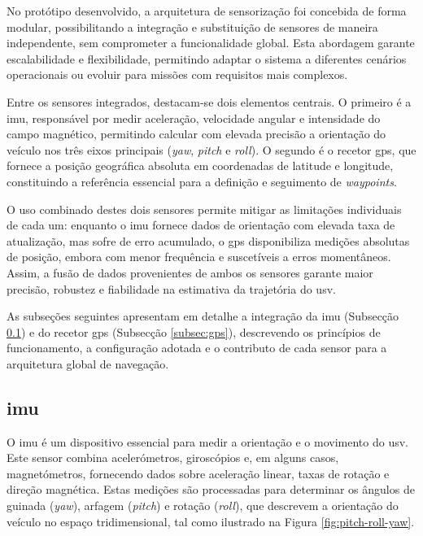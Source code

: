 No protótipo desenvolvido, a arquitetura de sensorização foi concebida de forma modular, possibilitando a integração e substituição de sensores de maneira independente, sem comprometer a funcionalidade global. Esta abordagem garante escalabilidade e flexibilidade, permitindo adaptar o sistema a diferentes cenários operacionais ou evoluir para missões com requisitos mais complexos.  

Entre os sensores integrados, destacam-se dois elementos centrais. O primeiro é a \acrfull{imu}, responsável por medir aceleração, velocidade angular e intensidade do campo magnético, permitindo calcular com elevada precisão a orientação do veículo nos três eixos principais (\emph{yaw}, \emph{pitch} e \emph{roll}). O segundo é o recetor \acrfull{gps}, que fornece a posição geográfica absoluta em coordenadas de latitude e longitude, constituindo a referência essencial para a definição e seguimento de \emph{waypoints}.  

O uso combinado destes dois sensores permite mitigar as limitações individuais de cada um: enquanto o \gls{imu} fornece dados de orientação com elevada taxa de atualização, mas sofre de erro acumulado, o \gls{gps} disponibiliza medições absolutas de posição, embora com menor frequência e suscetíveis a erros momentâneos. Assim, a fusão de dados provenientes de ambos os sensores garante maior precisão, robustez e fiabilidade na estimativa da trajetória do \gls{usv}.  

As subseções seguintes apresentam em detalhe a integração da \acrfull{imu} (Subsecção \ref{subsec:imu}) e do recetor \acrfull{gps} (Subsecção \ref{subsec:gps}), descrevendo os princípios de funcionamento, a configuração adotada e o contributo de cada sensor para a arquitetura global de navegação.


\subsection{\acrfull{imu}} \label{subsec:imu}

O \gls{imu} é um dispositivo essencial para medir a orientação e o movimento do \gls{usv}. Este sensor combina acelerómetros, giroscópios e, em alguns casos, magnetómetros, fornecendo dados sobre aceleração linear, taxas de rotação e direção magnética. Estas medições são processadas para determinar os ângulos de guinada (\emph{yaw}), arfagem (\emph{pitch}) e rotação (\emph{roll}), que descrevem a orientação do veículo no espaço tridimensional, tal como ilustrado na Figura \ref{fig:pitch-roll-yaw}.

